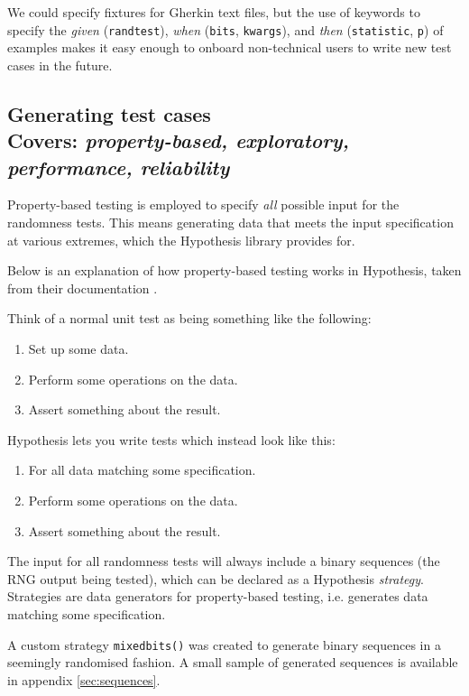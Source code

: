 \documentclass[11pt]{article}
\begin{document}
We could specify fixtures for Gherkin text files, but the use of keywords to specify the \textit{given} (\texttt{randtest}), \textit{when} (\texttt{bits}, \texttt{kwargs}), and \textit{then} (\texttt{statistic}, \texttt{p}) of examples makes it easy enough to onboard non-technical users to write new test cases in the future.

\subsection[Generating test cases]{Generating test cases\\ \small{Covers: \emph{property-based, exploratory, performance, reliability}}}
\label{sec:property}

Property-based testing is employed to specify \emph{all} possible input for the randomness tests. This means generating data that meets the input specification at various extremes, which the Hypothesis library provides for.

Below is an explanation of how property-based testing works in Hypothesis, taken from their documentation \cite{hypothesis}.
\begin{displayquote}
Think of a normal unit test as being something like the following:

\begin{enumerate}
\item Set up some data.
\item Perform some operations on the data.
\item Assert something about the result.
\end{enumerate}

Hypothesis lets you write tests which instead look like this:

\begin{enumerate}
\item For all data matching some specification.
\item Perform some operations on the data.
\item Assert something about the result.
\end{enumerate}
\end{displayquote}

The input for all randomness tests will always include a binary sequences (the RNG output being tested), which can be declared as a Hypothesis \emph{strategy}. Strategies are data generators for property-based testing, i.e. generates data matching some specification.

A custom strategy \texttt{mixedbits()} was created to generate binary sequences in a seemingly randomised fashion. A small sample of generated sequences is available in appendix \ref{sec:sequences}.
\end{document}

